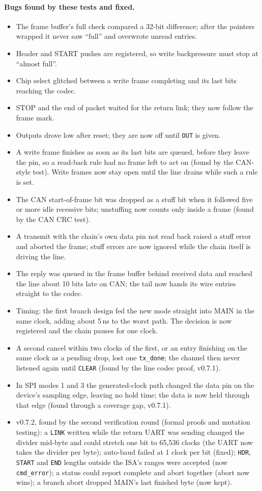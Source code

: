 \documentclass[11pt,a4paper]{article}
\newcommand{\sig}[1]{\texttt{#1}}
\begin{document}
\paragraph{Bugs found by these tests and fixed.}
\begin{itemize}
\item The frame buffer's full check compared a 32-bit difference; after the pointers wrapped it never saw ``full'' and overwrote unread entries.
\item Header and START pushes are registered, so write backpressure must stop at ``almost full''.
\item Chip select glitched between a write frame completing and its last bits reaching the codec.
\item STOP and the end of packet waited for the return link; they now follow the frame mark.
\item Outputs drove low after reset; they are now off until \sig{OUT} is given.
\item A write frame finishes as soon as its last bits are queued, before they leave the pin, so a read-back rule had no frame left to act on (found by the CAN-style test). Write frames now stay open until the line drains while such a rule is set.
\item The CAN start-of-frame bit was dropped as a stuff bit when it followed five or more idle recessive bits; unstuffing now counts only inside a frame (found by the CAN CRC test).
\item A transmit with the chain's own data pin not read back raised a stuff error and aborted the frame; stuff errors are now ignored while the chain itself is driving the line.
\item The reply was queued in the frame buffer behind received data and reached the line about 10 bits late on CAN; the tail now hands its wire entries straight to the codec.
\item Timing: the first branch design fed the new mode straight into MAIN in the same clock, adding about 5\,ns to the worst path. The decision is now registered and the chain pauses for one clock.
\item A second cancel within two clocks of the first, or an entry finishing on the same clock as a pending drop, lost one \sig{tx\_done}; the channel then never listened again until \sig{CLEAR} (found by the line codec proof, v0.7.1).
\item In SPI modes 1 and 3 the generated-clock path changed the data pin on the device's sampling edge, leaving no hold time; the data is now held through that edge (found through a coverage gap, v0.7.1).
\item v0.7.2, found by the second verification round (formal proofs and mutation testing): a \sig{LINK} written while the return UART was sending changed the divider mid-byte and could stretch one bit to 65,536 clocks (the UART now takes the divider per byte); auto-baud failed at 1 clock per bit (fixed); \sig{HDR}, \sig{START} and \sig{END} lengths outside the ISA's ranges were accepted (now \sig{cmd\_error}); a status could report complete and abort together (abort now wins); a branch abort dropped MAIN's last finished byte (now kept).
\end{itemize}
\end{document}
